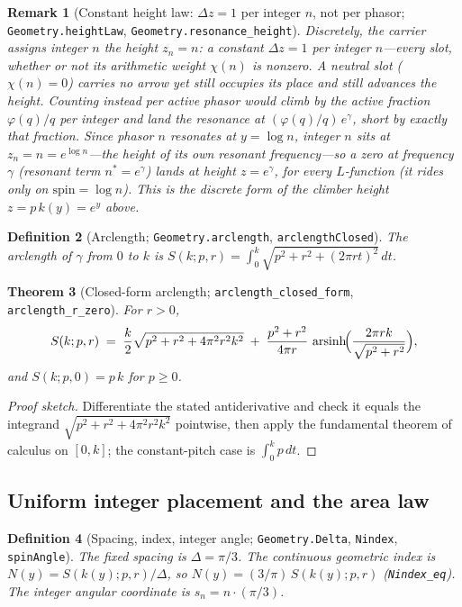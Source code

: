 \documentclass[11pt]{article}
\newtheorem{definition}{Definition}[section]
\newtheorem{theorem}[definition]{Theorem}
\newtheorem{remark}[definition]{Remark}
\newcommand{\code}[1]{\texttt{#1}}
\begin{document}
\begin{remark}[Constant height law: $\Delta z=1$ per integer $n$, not per phasor; \code{Geometry.heightLaw}, \code{Geometry.resonance\_height}]\label{rem:height}
Discretely, the carrier assigns integer $n$ the height $z_n=n$: a constant $\Delta z=1$
\emph{per integer $n$}---every slot, whether or not its arithmetic weight $\chi(n)$ is nonzero.
A neutral slot ($\chi(n)=0$) carries no arrow yet still occupies its place and still advances the
height. Counting instead per \emph{active} phasor would climb by the active fraction
$\varphi(q)/q$ per integer and land the resonance at $(\varphi(q)/q)\,e^{\gamma}$, short by exactly
that fraction. Since phasor $n$ resonates at $y=\log n$, integer $n$ sits at $z_n=n=e^{\log n}$---the
height of its own resonant frequency---so a zero at frequency $\gamma$ (resonant term
$n^\ast=e^{\gamma}$) lands at height $z=e^{\gamma}$, for every $L$-function (it rides only on
$\mathrm{spin}=\log n$). This is the discrete form of the climber height $z=p\,k(y)=e^{y}$ above.
\end{remark}

\begin{definition}[Arclength; \code{Geometry.arclength}, \code{arclengthClosed}]\label{def:arclength}
The arclength of $\gamma$ from $0$ to $k$ is
$\displaystyle S(k;p,r)=\int_0^k\sqrt{p^2+r^2+(2\pi r t)^2}\,dt$.
\end{definition}

\begin{theorem}[Closed-form arclength; \code{arclength\_closed\_form}, \code{arclength\_r\_zero}]\label{thm:arclength}
For $r>0$,
\[
  S(k;p,r) \;=\; \frac{k}{2}\sqrt{p^2+r^2+4\pi^2 r^2 k^2}
   \;+\;\frac{p^2+r^2}{4\pi r}\,\operatorname{arsinh}\!\Bigl(\frac{2\pi r k}{\sqrt{p^2+r^2}}\Bigr),
\]
and $S(k;p,0)=p\,k$ for $p\ge 0$.
\end{theorem}

\begin{proof}[Proof sketch]
Differentiate the stated antiderivative and check it equals the integrand
$\sqrt{p^2+r^2+4\pi^2r^2k^2}$ pointwise, then apply the fundamental theorem of calculus on
$[0,k]$; the constant-pitch case is $\int_0^k p\,dt$.
\end{proof}

\subsection{Uniform integer placement and the area law}

\begin{definition}[Spacing, index, integer angle; \code{Geometry.Delta}, \code{Nindex}, \code{spinAngle}]\label{def:placement}
The fixed spacing is $\Delta=\pi/3$. The continuous geometric index is $N(y)=S(k(y);p,r)/\Delta$,
so $N(y)=(3/\pi)\,S(k(y);p,r)$ (\code{Nindex\_eq}). The integer angular coordinate is
$s_n=n\cdot(\pi/3)$.
\end{definition}
\end{document}
